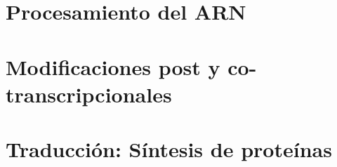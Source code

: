 


\section{Procesamiento del ARN}



\section{Modificaciones post y co-transcripcionales}



\section{Traducción: Síntesis de proteínas}




